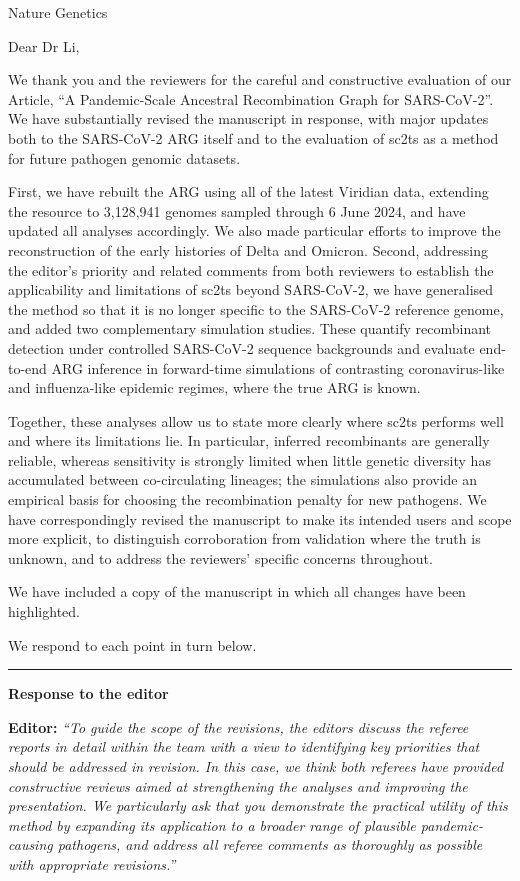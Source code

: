 \documentclass{letter}
\begin{document}
\begin{letter}{Nature Genetics}

\opening{Dear Dr Li,}

We thank you and the reviewers for the careful and constructive evaluation of
our Article, ``A Pandemic-Scale Ancestral Recombination Graph for SARS-CoV-2''.
We have substantially revised the manuscript in response, with major updates
both to the SARS-CoV-2 ARG itself and to the evaluation of sc2ts as a method
for future pathogen genomic datasets.

First, we have rebuilt the ARG using all of the latest Viridian data, extending
the resource to 3,128,941 genomes sampled through 6 June 2024, and have updated
all analyses accordingly. We also made particular efforts to improve the
reconstruction of the early histories of Delta and Omicron. Second,
addressing the editor’s priority and related comments from both reviewers
to establish the applicability and
limitations of sc2ts beyond SARS-CoV-2, we have generalised the method so that
it is no longer specific to the SARS-CoV-2 reference genome, and added two
complementary simulation studies. These quantify recombinant detection under
controlled SARS-CoV-2 sequence backgrounds and evaluate end-to-end ARG
inference in forward-time simulations of contrasting coronavirus-like and
influenza-like epidemic regimes, where the true ARG is known.

Together, these analyses allow us to state more clearly where sc2ts performs
well and where its limitations lie. In particular, inferred recombinants are
generally reliable, whereas sensitivity is strongly limited when little genetic
diversity has accumulated between co-circulating lineages; the simulations also
provide an empirical basis for choosing the recombination penalty for new
pathogens. We have correspondingly revised the manuscript to make its intended
users and scope more explicit, to distinguish corroboration from validation
where the truth is unknown, and to address the reviewers' specific concerns
throughout.

We have included a copy of the manuscript in which all changes have been
highlighted.

We respond to each point in turn below.

\medskip
\hrule
\medskip

\noindent \textbf{Response to the editor}

\noindent \textbf{Editor:} \textit{``To guide the scope of the revisions, the editors
discuss the referee reports in detail within the team with a view to
identifying key priorities that should be addressed in revision. In this case,
we think both referees have provided constructive reviews aimed at
strengthening the analyses and improving the presentation. We particularly ask
that you demonstrate the practical utility of this method by expanding its
application to a broader range of plausible pandemic-causing pathogens, and
address all referee comments as thoroughly as possible with appropriate
revisions.''}


\end{letter}
\end{document}
